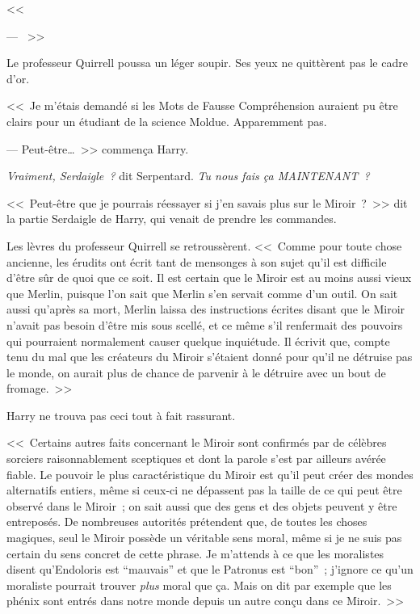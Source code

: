 <<~

--- ~>>

Le professeur Quirrell poussa un léger soupir. Ses yeux ne quittèrent pas le cadre d'or.

<<~Je m'étais demandé si les Mots de Fausse Compréhension auraient pu être clairs pour un étudiant de la science Moldue. Apparemment pas.

--- Peut-être…~>> commença Harry.

\emph{Vraiment, Serdaigle~?} dit Serpentard. \emph{Tu nous fais ça MAINTENANT~?}

<<~Peut-être que je pourrais réessayer si j'en savais plus sur le Miroir~?~>> dit la partie Serdaigle de Harry, qui venait de prendre les commandes.

Les lèvres du professeur Quirrell se retroussèrent. <<~Comme pour toute chose ancienne, les érudits ont écrit tant de mensonges à son sujet qu'il est difficile d'être sûr de quoi que ce soit. Il est certain que le Miroir est au moins aussi vieux que Merlin, puisque l'on sait que Merlin s'en servait comme d'un outil. On sait aussi qu'après sa mort, Merlin laissa des instructions écrites disant que le Miroir n'avait pas besoin d'être mis sous scellé, et ce même s'il renfermait des pouvoirs qui pourraient normalement causer quelque inquiétude. Il écrivit que, compte tenu du mal que les créateurs du Miroir s'étaient donné pour qu'il ne détruise pas le monde, on aurait plus de chance de parvenir à le détruire avec un bout de fromage.~>>

Harry ne trouva pas ceci tout à fait rassurant.

<<~Certains autres faits concernant le Miroir sont confirmés par de célèbres sorciers raisonnablement sceptiques et dont la parole s'est par ailleurs avérée fiable. Le pouvoir le plus caractéristique du Miroir est qu'il peut créer des mondes alternatifs entiers, même si ceux-ci ne dépassent pas la taille de ce qui peut être observé dans le Miroir~; on sait aussi que des gens et des objets peuvent y être entreposés. De nombreuses autorités prétendent que, de toutes les choses magiques, seul le Miroir possède un véritable sens moral, même si je ne suis pas certain du sens concret de cette phrase. Je m'attends à ce que les moralistes disent qu'Endoloris est “mauvais” et que le Patronus est “bon”~; j'ignore ce qu'un moraliste pourrait trouver \emph{plus} moral que ça. Mais on dit par exemple que les phénix sont entrés dans notre monde depuis un autre conçu dans ce Miroir.~>>

